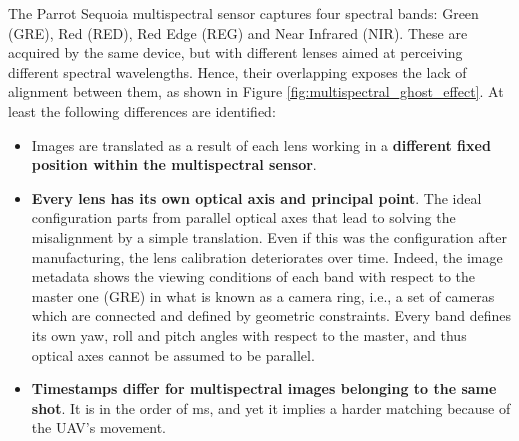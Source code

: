 The Parrot Sequoia multispectral sensor captures four spectral bands: Green (GRE), Red (RED), Red Edge (REG) and Near Infrared (NIR). These are acquired by the same device, but with different lenses aimed at perceiving different spectral wavelengths. Hence, their overlapping exposes the lack of alignment between them, as shown in Figure \ref{fig:multispectral_ghost_effect}. At least the following differences are identified: 
\begin{itemize}
    \item Images are translated as a result of each lens working in a \textbf{different fixed position within the multispectral sensor}. 
    \item \textbf{Every lens has its own optical axis and principal point}. The ideal configuration parts from parallel optical axes that lead to solving the misalignment by a simple translation. Even if this was the configuration after manufacturing, the lens calibration deteriorates over time. Indeed, the image metadata shows the viewing conditions of each band with respect to the master one (GRE) in what is known as a camera ring, i.e., a set of cameras which are connected and defined by geometric constraints. Every band defines its own yaw, roll and pitch angles with respect to the master, and thus optical axes cannot be assumed to be parallel.
    \item \textbf{Timestamps differ for multispectral images belonging to the same shot}. It is in the order of \si{\milli\second}, and yet it implies a harder matching because of the UAV's movement.
\end{itemize}

